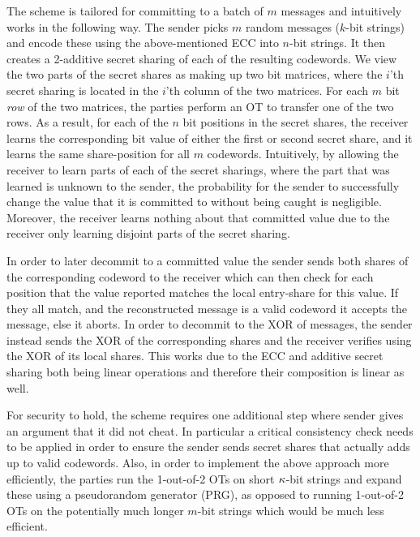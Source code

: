 The \cite{DBLP:conf/tcc/FrederiksenJNT16} scheme is tailored for committing to a batch of $m$ messages and intuitively works in the following way. The sender picks $m$ random messages ($k$-bit strings) and encode these using the above-mentioned ECC into $n$-bit strings. It then creates a 2-additive secret sharing of each of the resulting codewords. We view the two parts of the secret shares as making up two bit matrices, where the $i$'th secret sharing is located in the $i$'th column of the two matrices. For each $m$ bit \emph{row} of the two matrices, the parties perform an OT to transfer one of the two rows. As a result, for each of the $n$ bit positions in the secret shares, the receiver learns the corresponding bit value of either the first or second secret share, and it learns the same share-position for all $m$ codewords. Intuitively, by allowing the receiver to learn parts of each of the secret sharings, where the part that was learned is unknown to the sender, the probability for the sender to successfully change the value that it is committed to without being caught is negligible. Moreover, the receiver learns nothing about that committed value due to the receiver only learning disjoint parts of the secret sharing.

In order to later decommit to a committed value the sender sends both shares of the corresponding codeword to the receiver which can then check for each position that the value reported matches the local entry-share for this value. If they all match, and the reconstructed message is a valid codeword it accepts the message, else it aborts. In order to decommit to the XOR of messages, the sender instead sends the XOR of the corresponding shares and the receiver verifies using the XOR of its local shares. This works due to the ECC and additive secret sharing both being linear operations and therefore their composition is linear as well. 

For security to hold, the scheme requires one additional step where sender gives an argument that it did not cheat. In particular a critical consistency check needs to be applied in order to ensure the sender sends secret shares that actually adds up to valid codewords. Also, in order to implement the above approach more efficiently, the parties run the 1-out-of-2 OTs on short $\kappa$-bit strings and expand these using a pseudorandom generator (PRG), as opposed to running 1-out-of-2 OTs on the potentially much longer $m$-bit strings which would be much less efficient.